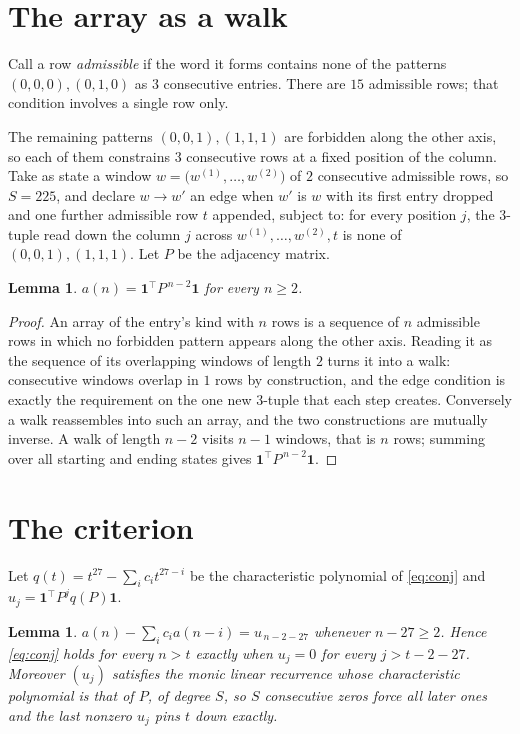 \documentclass[11pt,a4paper]{article}
\theoremstyle{plain}
\newtheorem{lemma}[theorem]{Lemma}
\theoremstyle{definition}
\begin{document}
\section{The array as a walk}

Call a row \emph{admissible} if the word it forms contains none of the patterns
$(0,0,0), (0,1,0)$ as $3$ consecutive entries. There are $15$ admissible rows; that condition
involves a single row only.

The remaining patterns $(0,0,1), (1,1,1)$ are forbidden along the other axis, so each of them
constrains $3$ consecutive rows at a fixed position of the column. Take as state a
window $w=\bigl(w^{(1)},\dots,w^{(2)}\bigr)$ of $2$ consecutive admissible
rows, so $S=225$, and declare $w\to w'$ an edge when $w'$ is $w$ with its first entry
dropped and one further admissible row $t$ appended, subject to: for every position
$j$, the $3$-tuple read down the column $j$ across $w^{(1)},\dots,w^{(2)},t$
is none of $(0,0,1), (1,1,1)$. Let $P$ be the adjacency matrix.

\begin{lemma}\label{lem:walk}
$a(n)=\mathbf{1}^{\!\top}P^{\,n-2}\mathbf{1}$ for every $n\ge2$.
\end{lemma}

\begin{proof}
An array of the entry's kind with $n$ rows is a sequence of $n$ admissible rows in
which no forbidden pattern appears along the other axis. Reading it as the sequence of its
overlapping windows of length $2$ turns it into a walk: consecutive windows overlap in
$1$ rows by construction, and the edge condition is exactly the requirement on the one
new $3$-tuple that each step creates. Conversely a walk reassembles into such an array,
and the two constructions are mutually inverse. A walk of length $n-2$ visits $n-1$
windows, that is $n$ rows; summing over all starting and ending states gives
$\mathbf{1}^{\!\top}P^{\,n-2}\mathbf{1}$.
\end{proof}

\section{The criterion}

Let $q(t)=t^{27}-\sum_i c_i t^{27-i}$ be the characteristic polynomial of
\eqref{eq:conj} and $u_j=\mathbf{1}^{\!\top}P^{j}q(P)\mathbf{1}$.

\begin{lemma}\label{lem:crit}
$a(n)-\sum_i c_i a(n-i)=u_{\,n-2-27}$ whenever $n-27\ge2$. Hence
\eqref{eq:conj} holds for every $n>t$ exactly when $u_j=0$ for every
$j>t-2-27$. Moreover $(u_j)$ satisfies the monic linear recurrence whose
characteristic polynomial is that of $P$, of degree $S$, so $S$ consecutive zeros force all
later ones and the last nonzero $u_j$ pins $t$ down exactly.
\end{lemma}
\end{document}

